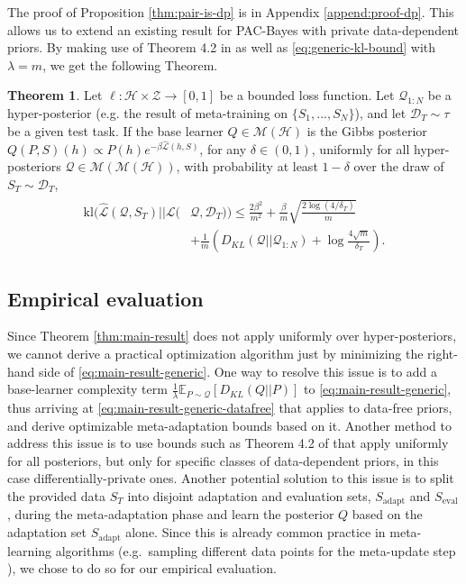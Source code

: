 \documentclass[letterpaper]{article} %
\theoremstyle{definition}
\newtheorem{theorem}{Theorem}[section]
\newcommand{\Expect}[2]{\mathbb{E}_{#1}\left [#2 \right ]}
\begin{document}
The proof of Proposition \ref{thm:pair-is-dp} is in Appendix \ref{append:proof-dp}. This  allows us to extend an existing result for PAC-Bayes with private data-dependent priors.
By making use of Theorem 4.2 in \citet{Dziugaite2018} as well as  \eqref{eq:generic-kl-bound} with $\lambda=m$, we get the following Theorem.

\begin{theorem} \label{thm:kl-main-result}
	Let $\ell:\mathcal{H}\times \mathcal{Z}\rightarrow [0,1]$ be a bounded loss function.
	Let $\mathcal{Q}_{1:N}$ be a hyper-posterior (e.g. the result of meta-training on $\{S_1,...,S_N\}$), and let $\mathcal{D}_T\sim \tau$ be a given test task. 
	If the base learner $Q\in \mathcal{M}(\mathcal{H})$ is the Gibbs posterior $Q(P, S)(h)\propto P(h)e^{-\beta\hat{\mathcal{L}}(h, S)}$, 
	for any $\delta\in(0,1)$, uniformly for all hyper-posteriors $\mathcal{Q}\in \mathcal{M}(\mathcal{M}(\mathcal{H}))$, with probability at least $1-\delta$ over the draw of $S_T\sim \mathcal{D}_T$,
%
	\begin{align*} 
	\begin{split}
	\mathrm{kl}(\hat{\mathcal{L}}(\mathcal{Q},S_T)||\mathcal{L}(&\mathcal{Q},\mathcal{D}_T))\leq \frac{2\beta^2}{m^2}+\frac{\beta}{m}\sqrt{\frac{2\log (4/\delta_T)}{m}} \\
	&+\frac{1}{m}\left (D_{KL}(\mathcal{Q}||\mathcal{Q}_{1:N})+\log\frac{4\sqrt{m}}{\delta_T} \right ) .
	\end{split}
	\end{align*}
	
\end{theorem}

\subsection{Empirical evaluation}

Since Theorem \ref{thm:main-result} does not apply uniformly over hyper-posteriors, we cannot derive a practical optimization algorithm just by minimizing the right-hand side of  \eqref{eq:main-result-generic}. 
One way to resolve this issue is to add a base-learner complexity term $\frac{1}{\lambda}\Expect{P\sim \mathcal{Q}}{D_{KL}(Q||P)}$ to  \eqref{eq:main-result-generic}, thus arriving at \eqref{eq:main-result-generic-datafree} that applies to data-free priors, and derive optimizable meta-adaptation bounds based on it.
Another method to address this issue is to use bounds such as Theorem 4.2 of \citet{Dziugaite2018} that apply uniformly for all posteriors, but only for specific classes of data-dependent priors, in this case differentially-private ones.
Another potential solution to this issue is to split the provided data $S_T$ into disjoint adaptation and evaluation sets, $S_{\mathrm{adapt}}$ and $S_{\mathrm{eval}}$, during the meta-adaptation phase and learn the posterior $Q$ based on the adaptation set $S_{\mathrm{adapt}}$ alone. Since this is already common practice in meta-learning algorithms (e.g.\ sampling different data points for the meta-update step ), we chose to do so for our empirical evaluation. %
\end{document}
